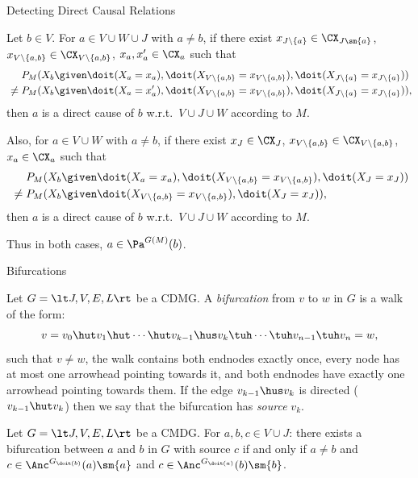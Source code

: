 \begin{frame}{Detecting Direct Causal Relations}
\begin{Cor}[\ref{cor:scm_identify_direct_causal_relation}]
  Let $b \in V$.
  For $a \in V \cup W \cup J$ with $a \ne b$, if there exist $x_{J\setminus\{a\}} \in \CX_{J\sm\{a\}}$, $x_{V\setminus\{a,b\}} \in \CX_{V\setminus\{a,b\}}$, $x_a,x_a' \in \CX_a$ such that
      \begin{equation*}\begin{split}
        & P_{M}(X_b \given \doit(X_a=x_a),\doit(X_{V\setminus\{a,b\}}=x_{V\setminus\{a,b\}}),\doit(X_{J\setminus \{a\}}=x_{J\setminus \{a\}})) \\
        {} \ne {} & P_{M}(X_b \given \doit(X_a=x_a'),\doit(X_{V\setminus\{a,b\}}=x_{V\setminus\{a,b\}}),\doit(X_{J\setminus\{a\}}=x_{J\setminus\{a\}})),
      \end{split}\end{equation*}
  then $a$ is a direct cause of $b$ w.r.t.\ $V \cup J \cup W$ according to $M$.

  Also, for $a \in V \cup W$ with $a \ne b$, if there exist $x_J \in \CX_J$, $x_{V\setminus\{a,b\}} \in \CX_{V\setminus\{a,b\}}$, $x_a \in \CX_a$ such that
      \begin{equation*}\begin{split}
        & P_{M}(X_b \given \doit(X_a=x_a),\doit(X_{V\setminus\{a,b\}}=x_{V\setminus\{a,b\}}),\doit(X_J=x_J)) \\
        {} \ne {} & P_{M}(X_b \given \doit(X_{V\setminus\{a,b\}}=x_{V\setminus\{a,b\}}),\doit(X_J=x_J)),
      \end{split}\end{equation*}
  then $a$ is a direct cause of $b$ w.r.t.\ $V \cup J \cup W$ according to $M$.
  
  Thus in both cases, $a \in \Pa^{G(M)}(b)$.
\end{Cor}
\end{frame}

\begin{frame}{Bifurcations}
  \begin{Def}
    Let $G = \lt J, V, E, L \rt$ be a CDMG. 
    A \emph{bifurcation} from $v$ to $w$ in $G$ is a walk of the form:
        \[v=v_0 \hut v_1 \hut  \cdots \hut v_{k-1} \hus v_k  \tuh \cdots \tuh v_{n-1} \tuh v_n=w,\]
        such that $v \ne w$, the walk contains both endnodes exactly once, 
        every node has at most one arrowhead pointing towards it, and 
        both endnodes have exactly one arrowhead pointing towards them. 
          If the edge $v_{k-1} \hus v_k$ is directed ($v_{k-1} \hut v_k$) then we say that the bifurcation has \emph{source} $v_{k}$.
  \end{Def}
\begin{Prp}[\ref{prp:bifurcations_alternative}]
  Let $G = \lt J, V, E, L \rt$ be a CMDG. For $a, b, c \in V \cup J$:
  there exists a bifurcation between $a$ and $b$ in $G$ with source $c$ if and only if $a \ne b$ and $c \in \Anc^{G_{\doit(b)}}(a) \sm \{a\}$ and $c \in \Anc^{G_{\doit(a)}}(b) \sm \{b\}$.
\end{Prp}
\end{frame}

